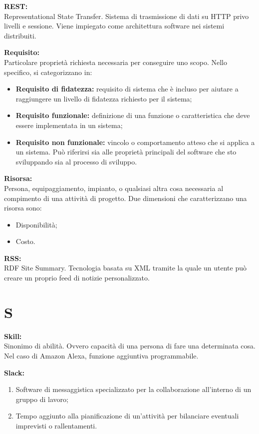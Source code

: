 \documentclass[a4paper, oneside, openany, dvipsnames, table]{article}
\begin{document}
\textbf{REST:}\\
Representational State Transfer. Sistema di trasmissione di dati su HTTP privo livelli e sessione. Viene impiegato come architettura software nei sistemi distribuiti.

\textbf{Requisito:}\\	Particolare proprietà richiesta necessaria per conseguire uno scopo. Nello specifico, si categorizzano in:
\begin{itemize}
	\item \textbf{Requisito di fidatezza:} requisito di sistema che è incluso per aiutare a raggiungere un livello di fidatezza richiesto per il sistema;
	\item \textbf{Requisito funzionale:} definizione di una funzione o caratteristica che deve essere implementata in un sistema;
	\item \textbf{Requisito non funzionale:} vincolo o comportamento atteso che si applica a un sistema. Può riferirsi sia alle proprietà principali del software che sto sviluppando sia al processo di sviluppo.
\end{itemize}

\textbf{Risorsa:}\\	Persona, equipaggiamento, impianto, o qualsiasi altra cosa necessaria al compimento di una attività di progetto. Due dimensioni che caratterizzano una risorsa sono:
\begin{itemize}
\item Disponibilità;
\item Costo.
\end{itemize} 

\textbf{RSS:}\\	RDF Site Summary. Tecnologia basata su XML tramite la quale un utente può creare un proprio feed di notizie personalizzato.
\newpage
\section{S}
\textbf{Skill:}\\	Sinonimo di abilità. Ovvero capacità di una persona di fare una determinata cosa. Nel caso di Amazon Alexa, funzione aggiuntiva programmabile.

\textbf{Slack:}
\begin{enumerate}
	\item Software di messaggistica specializzato per la collaborazione all'interno di un gruppo di lavoro;
	\item Tempo aggiunto alla pianificazione di un'attività per bilanciare eventuali imprevisti o rallentamenti.
\end{enumerate} 
\end{document}
